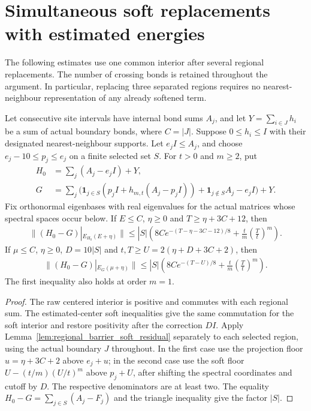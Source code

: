 \section{Simultaneous soft replacements with estimated energies}
\label{sec:alvv_simultaneous_soft_residuals}

The following estimates use one common interior after several regional
replacements. The number of crossing bonds is retained throughout the
argument. In particular, replacing three separated regions requires no
nearest-neighbour representation of any already softened term.

\begin{lemma}
    \label{lem:alvv_soft_family_residuals}
    \leanok
    Let consecutive site intervals have internal bond sums $A_j$, and
    let $Y=\sum_{i\in J}h_i$ be a sum of actual boundary bonds, where
    $C=|J|$. Suppose $0\leq h_i\leq I$ with their designated
    nearest-neighbour supports. Let $e_jI\leq A_j$, and choose
    $e_j-10\leq p_j\leq e_j$ on a finite selected set $S$.
    For $t>0$ and $m\geq2$, put
    \begin{align}
        H_0 & =\sum_j(A_j-e_jI)+Y,           \\
        G   & =\sum_j\bigl(\mathbf1_{j\in S}
        (p_jI+h_{m,t}(A_j-p_jI))+
        \mathbf1_{j\notin S}A_j-e_jI\bigr)+Y.
    \end{align}
    Fix orthonormal eigenbases with real eigenvalues for the actual
    matrices whose spectral spaces occur below. If $E\leq C$,
    $\eta\geq0$ and $T\geq\eta+3C+12$, then
    \begin{align}
        \|(H_0-G)|_{E_{H_0}(E+\eta)}\|
        \leq |S|\left(8Ce^{-(T-\eta-3C-12)/8}
        +\frac{t}{m}\left(\frac Tt\right)^m\right).
    \end{align}
    If $\mu\leq C$, $\eta\geq0$, $D=10|S|$ and
    $t,T\geq U=2(\eta+D+3C+2)$, then
    \begin{align}
        \|(H_0-G)|_{E_G(\mu+\eta)}\|
        \leq |S|\left(8Ce^{-(T-U)/8}
        +\frac{t}{m}\left(\frac Tt\right)^m\right).
    \end{align}
    The first inequality also holds at order $m=1$.
\end{lemma}
\begin{proof}\leanok
    The raw centered interior is positive and commutes with each
    regional sum. The estimated-center soft inequalities give the
    same commutation for the soft interior and restore positivity
    after the correction $DI$. Apply
    Lemma~\ref{lem:regional_barrier_soft_residual} separately to each
    selected region, using the actual boundary $J$ throughout.
    In the first case use the projection floor
    $u=\eta+3C+2$ above $e_j+u$; in the second case use the soft floor
    $U-(t/m)(U/t)^m$ above $p_j+U$, after shifting the spectral
    coordinates and cutoff by $D$. The respective denominators are
    at least two. The equality $H_0-G=\sum_{j\in S}(A_j-F_j)$
    and the triangle inequality give the factor $|S|$.
\end{proof}

